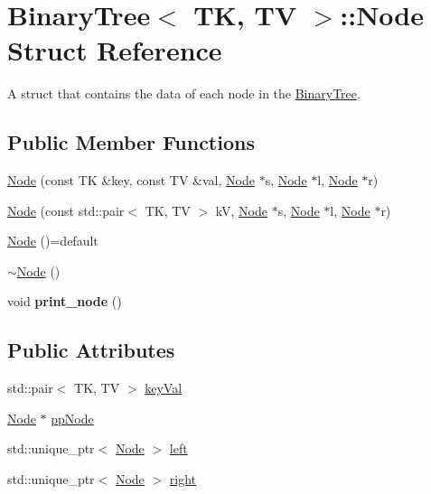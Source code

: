 \hypertarget{structBinaryTree_1_1Node}{}\section{Binary\+Tree$<$ TK, TV $>$\+::Node Struct Reference}
\label{structBinaryTree_1_1Node}


A struct that contains the data of each node in the \mbox{\hyperlink{classBinaryTree}{Binary\+Tree}}.  


\subsection*{Public Member Functions}
\begin{DoxyCompactItemize}
\item 
\mbox{\hyperlink{structBinaryTree_1_1Node_aa1377acea199be263e4bbc0d7fda4eaa}{Node}} (const TK \&key, const TV \&val, \mbox{\hyperlink{structBinaryTree_1_1Node}{Node}} $\ast$s, \mbox{\hyperlink{structBinaryTree_1_1Node}{Node}} $\ast$l, \mbox{\hyperlink{structBinaryTree_1_1Node}{Node}} $\ast$r)
\item 
\mbox{\hyperlink{structBinaryTree_1_1Node_a6137917f379c2ed5b3a78d4d9da6ddf8}{Node}} (const std\+::pair$<$ TK, TV $>$ kV, \mbox{\hyperlink{structBinaryTree_1_1Node}{Node}} $\ast$s, \mbox{\hyperlink{structBinaryTree_1_1Node}{Node}} $\ast$l, \mbox{\hyperlink{structBinaryTree_1_1Node}{Node}} $\ast$r)
\item 
\mbox{\hyperlink{structBinaryTree_1_1Node_ac4125f9e0b3d8a75cc0f1c7bbcc5d838}{Node}} ()=default
\item 
\mbox{\hyperlink{structBinaryTree_1_1Node_a3af4f97d0e37aaaa62fa9b3cc15864fb}{$\sim$\+Node}} ()
\item 
\mbox{\label{structBinaryTree_1_1Node_ae3026e842cac37f99326e26d62835f57}} 
void {\bfseries print\+\_\+node} ()
\end{DoxyCompactItemize}
\subsection*{Public Attributes}
\begin{DoxyCompactItemize}
\item 
std\+::pair$<$ TK, TV $>$ \mbox{\hyperlink{structBinaryTree_1_1Node_a072d4d35344db07dc1bdec47d78e3a63}{key\+Val}}
\item 
\mbox{\hyperlink{structBinaryTree_1_1Node}{Node}} $\ast$ \mbox{\hyperlink{structBinaryTree_1_1Node_a855b9a95346f66f45013ca406813a4d3}{pp\+Node}}
\item 
std\+::unique\+\_\+ptr$<$ \mbox{\hyperlink{structBinaryTree_1_1Node}{Node}} $>$ \mbox{\hyperlink{structBinaryTree_1_1Node_a4287689cdd537564e846184c76f084f7}{left}}
\item 
std\+::unique\+\_\+ptr$<$ \mbox{\hyperlink{structBinaryTree_1_1Node}{Node}} $>$ \mbox{\hyperlink{structBinaryTree_1_1Node_a098842d35cfa60029b10a7c4306f2ea6}{right}}
\end{DoxyCompactItemize}


